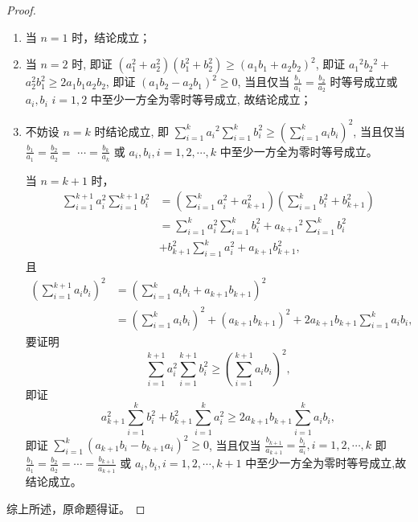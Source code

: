 \begin{proof}
  \begin{enumerate}
    \item 当 $n=1$ 时，结论成立；
    \item 当 $n=2$ 时, 即证 $\left(a_{1}^{2}+a_{2}^{2}\right)\left(b_{1}^{2}+b_{2}^{2}\right) \geq\left(a_{1} b_{1}+a_{2} b_{2}\right)^{2}$, 即证 $a_{1}{ }^{2} b_{2}{ }^{2}+$ $a_{2}^{2} b_{1}^{2} \geq 2 a_{1} b_{1} a_{2} b_{2}$, 即证 $\left(a_{1} b_{2}-a_{2} b_{1}\right)^{2} \geq 0$, 当且仅当 $\frac{b_{1}}{a_{1}}=\frac{b_{2}}{a_{2}}$ 时等号成立或 $a_{i}, b_{i}$ $i=1,2$ 中至少一方全为零时等号成立, 故结论成立；
    \item 不妨设 $n=k$ 时结论成立, 即 $\sum_{i=1}^{k} a_{i}{ }^{2} \sum_{i=1}^{k} b_{i}^{2} \geq\left(\sum_{i=1}^{k} a_{i} b_{i}\right)^{2}$, 当且仅当 $\frac{b_{1}}{a_{1}}=\frac{b_{2}}{a_{2}}=$ $\cdots=\frac{b_{k}}{a_{k}}$ 或 $a_{i}, b_{i}, i=1,2, \cdots, k$ 中至少一方全为零时等号成立。
    
    当 $n=k+1$ 时，
    \begin{align*}
      \sum_{i=1}^{k+1} a_{i}^{2} \sum_{i=1}^{k+1} b_{i}^{2} &=\left(\sum_{i=1}^{k} a_{i}^{2}+a_{k+1}^{2}\right)\left(\sum_{i=1}^{k} b_{i}^{2}+b_{k+1}^{2}\right) \\
      &=\sum_{i=1}^{k} a_{i}^{2} \sum_{i=1}^{k} b_{i}^{2}+a_{k+1}{ }^{2} \sum_{i=1}^{k} b_{i}^{2} \\
      &+b_{k+1}^{2} \sum_{i=1}^{k} a_{i}^{2}+a_{k+1} b_{k+1}^{2},
    \end{align*}且
    \begin{align*}
      \left(\sum_{i=1}^{k+1} a_{i} b_{i}\right)^{2} &=\left(\sum_{i=1}^{k} a_{i} b_{i}+a_{k+1} b_{k+1}\right)^{2} \\
      &=\left(\sum_{i=1}^{k} a_{i} b_{i}\right)^{2}+\left(a_{k+1} b_{k+1}\right)^{2}+2 a_{k+1} b_{k+1} \sum_{i=1}^{k} a_{i} b_{i},
    \end{align*}
    要证明 \[\sum_{i=1}^{k+1} a_{i}^{2} \sum_{i=1}^{k+1} b_{i}^{2} \geq\left(\sum_{i=1}^{k+1} a_{i} b_{i}\right)^{2},\]
    即证
    \[
      a_{k+1}^2 \sum_{i=1}^{k} b_{i}^{2}+b_{k+1}^{2} \sum_{i=1}^{k} a_{i}^{2} \geq 2 a_{k+1} b_{k+1} \sum_{i=1}^{k} a_{i} b_{i},
    \]
    即证 $\sum_{i=1}^{k}\left(a_{k+1} b_{i}-b_{k+1} a_{i}\right)^{2} \geq 0$, 当且仅当 $\frac{b_{k+1}}{a_{k+1}}=\frac{b_{i}}{a_{i}}, i=1,2, \cdots, k$ 即 $\frac{b_{1}}{a_{1}}=\frac{b_{2}}{a_{2}}=\cdots=\frac{b_{k+1}}{a_{k+1}}$ 或 $a_{i}, b_{i}, i=1,2, \cdots, k+1$ 中至少一方全为零时等号成立,故结论成立。
  \end{enumerate}

  综上所述，原命题得证。 \qedhere
\end{proof}

